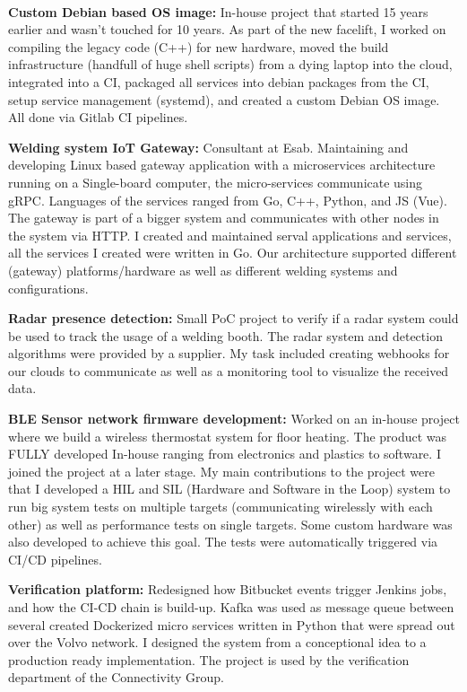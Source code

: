 
 \\
\SmallSep
\textbf{Custom Debian based OS image:} In-house project that started 15 years earlier and wasn't touched for 10 years. As part of the new facelift, I worked on compiling the legacy code (C++) for new hardware, moved the build infrastructure (handfull of huge shell scripts) from a dying laptop into the cloud, integrated into a CI, packaged all services into debian packages from the CI, setup service management (systemd), and created a custom Debian OS image. All done via Gitlab CI pipelines.
\SmallSep

\textbf{Welding system IoT Gateway:} Consultant at Esab. Maintaining and developing Linux based gateway application with a microservices architecture running on a Single-board computer, the micro-services communicate using gRPC. Languages of the services ranged from Go, C++, Python, and JS (Vue). The gateway is part of a bigger system and communicates with other nodes in the system via HTTP. I created and maintained serval applications and services, all the services I created were written in Go. Our architecture supported different (gateway) platforms/hardware as well as different welding systems and configurations.
\SmallSep 

\textbf{Radar presence detection:} Small PoC project to verify if a radar system could be used to track the usage of a welding booth. The radar system and detection algorithms were provided by a supplier. My task included creating webhooks for our clouds to communicate as well as a monitoring tool to visualize the received data. 
\SmallSep

\textbf{BLE Sensor network firmware development:} Worked on an in-house project where we build a wireless thermostat system for floor heating. The product was FULLY developed In-house ranging from electronics and plastics to software. I joined the project at a later stage. My main contributions to the project were that I developed a HIL and SIL (Hardware and Software in the Loop) system to run big system tests on multiple targets (communicating wirelessly with each other) as well as performance tests on single targets. Some custom hardware was also developed to achieve this goal. The tests were automatically triggered via CI/CD pipelines. \\ 
\Sep


\SmallSep
\textbf{Verification platform:} Redesigned how Bitbucket events trigger Jenkins jobs, and how the CI-CD chain is build-up. Kafka was used as message queue between several created Dockerized micro services written in Python that were spread out over the Volvo network. I designed the system from a conceptional idea to a production ready implementation. The project is used by the verification department of the Connectivity Group.
\SmallSep

